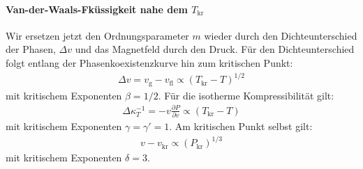 \paragraph*{Van-der-Waals-Fküssigkeit nahe dem $T_\mathrm{kr}$} Wir ersetzen jetzt den Ordnungsparameter $m$ wieder durch den Dichteunterschied der Phasen, $\Delta v$ und das Magnetfeld durch den Druck. 
Für den Dichteunterschied folgt entlang der Phasenkoexistenzkurve hin zum kritischen Punkt:
\begin{align*}
    \Delta v=v_\mathrm{g}-v_\mathrm{fl}\propto \left(T_\mathrm{kr}-T\right)^{1/2}
\end{align*}
mit kritischem Exponenten $\beta=1/2$.
Für die isotherme Kompressibilität gilt:
\begin{align*}
    \Delta \kappa_T^{-1}=-v\frac{\partial P}{\partial v}\propto \left(T_\mathrm{kr}-T\right)
\end{align*}
mit kritischem Exponenten $\gamma=\gamma '=1$.
Am kritischen Punkt selbst gilt:
\begin{align*}
    v-v_\mathrm{kr}\propto \left(P_\mathrm{kr}\right)^{1/3}
\end{align*}
mit kritischem Exponenten $\delta=3$. 

